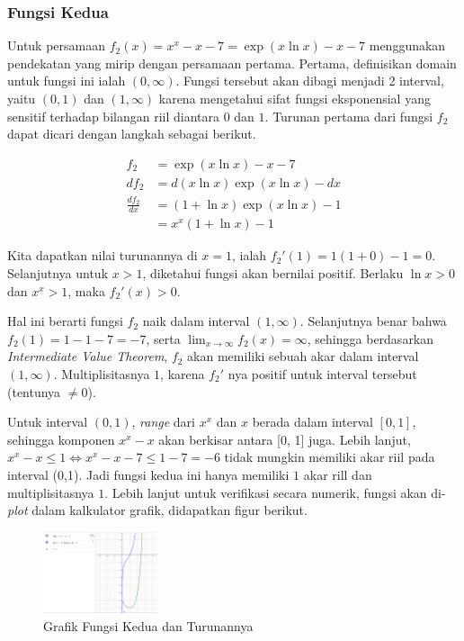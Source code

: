 \documentclass[11pt, a4paper, onecolumn, oneside, final]{report}
\begin{document}
\subsubsection*{Fungsi Kedua}

Untuk persamaan $f_2(x) = x^x - x - 7 = \exp(x \ln x) - x - 7$ menggunakan pendekatan yang mirip dengan persamaan pertama. Pertama, definisikan domain untuk fungsi ini ialah $(0, \infty)$. Fungsi tersebut akan dibagi menjadi 2 interval, yaitu $(0, 1)$ dan $(1, \infty)$ karena mengetahui sifat fungsi eksponensial yang sensitif terhadap bilangan riil diantara $0$ dan $1$. Turunan pertama dari fungsi $f_2$ dapat dicari dengan langkah sebagai berikut.

$$
\begin{aligned}
    f_2 &= \exp(x \ln x) - x - 7\\
    df_2 &= d(x\ln x)\exp(x \ln x) - dx\\
    \frac{df_2}{dx} &= (1 + \ln x)\exp(x \ln x) - 1\\
    &= x^x(1 + \ln x) - 1
\end{aligned}
$$

Kita dapatkan nilai turunannya di $x = 1$, ialah $f_2'(1) = 1(1 + 0) - 1 = 0$. Selanjutnya untuk $x > 1$, diketahui fungsi akan bernilai positif. Berlaku $\ln x > 0$ dan $x^x > 1$, maka $f_2'(x) > 0$.

Hal ini berarti fungsi $f_2$ naik dalam interval $(1, \infty)$. Selanjutnya benar bahwa $f_2(1) = 1 - 1 - 7 = -7$, serta $\lim_{x \to \infty} f_2(x) = \infty$, sehingga berdasarkan \textit{Intermediate Value Theorem}, $f_2$ akan memiliki sebuah akar dalam interval $(1, \infty)$. Multiplisitasnya $1$, karena $f_2'$ nya positif untuk interval tersebut (tentunya $\ne 0$).

Untuk interval $(0,1)$, \textit{range} dari $x^x$ dan $x$ berada dalam interval $[0, 1]$, sehingga komponen $x^x - x$ akan berkisar antara [0, 1] juga. Lebih lanjut, $x^x - x \leq 1 \iff x^x - x - 7 \leq 1 - 7 = -6$ tidak mungkin memiliki akar riil pada interval (0,1). Jadi fungsi kedua ini hanya memiliki $1$ akar rill dan multiplisitasnya $1$. Lebih lanjut untuk verifikasi secara numerik, fungsi akan di-\textit{plot} dalam kalkulator grafik, didapatkan figur berikut.

\begin{figure}[h!]
    \centering
    \includegraphics[width=0.3\textwidth]{assets/A1_2.png}
    \caption{Grafik Fungsi Kedua dan Turunannya}
\end{figure}
\end{document}
